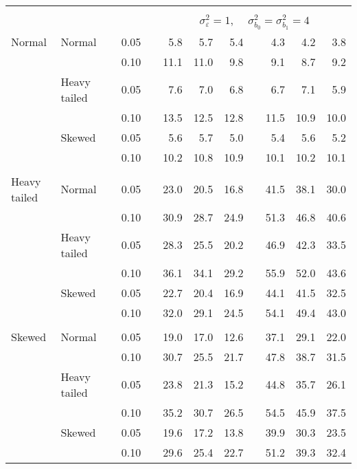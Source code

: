 \begin{table}[ht]
\begin{scriptsize}
\begin{center}
\begin{tabular}{ll p{.1cm} c p{.1cm} rrr p{.1cm} rrr}
&&&&&&&&&&&\\
& && && \multicolumn{7}{c}{$\sigma_{\varepsilon}^2 = 1$, \ \ $\sigma_{b_0}^2 = \sigma_{b_1}^2 = 4$} \\ \cline{6-12}
\rowcolor{gray!20}Normal       & Normal       && 0.05 &&   5.8 & 5.7 & 5.4 &   & 4.3 & 4.2 & 3.8 \\ 
\rowcolor{gray!20}             &              && 0.10 &&   11.1 & 11.0 & 9.8 &   & 9.1 & 8.7 & 9.2 \\ 
\rowcolor{gray!20}             & Heavy tailed && 0.05 &&   7.6 & 7.0 & 6.8 &   & 6.7 & 7.1 & 5.9 \\ 
\rowcolor{gray!20}             &              && 0.10 &&   13.5 & 12.5 & 12.8 &   & 11.5 & 10.9 & 10.0 \\ 
\rowcolor{gray!20}             & Skewed       && 0.05 &&   5.6 & 5.7 & 5.0 &   & 5.4 & 5.6 & 5.2 \\ 
\rowcolor{gray!20}             &              && 0.10 &&   10.2 & 10.8 & 10.9 &   & 10.1 & 10.2 & 10.1 \\ 
&&&&&&&&&&&\\
Heavy tailed & Normal       && 0.05 &&   23.0 & 20.5 & 16.8 &   & 41.5 & 38.1 & 30.0 \\ 
             &              && 0.10 &&   30.9 & 28.7 & 24.9 &   & 51.3 & 46.8 & 40.6 \\ 
             & Heavy tailed && 0.05 &&   28.3 & 25.5 & 20.2 &   & 46.9 & 42.3 & 33.5 \\ 
             &              && 0.10 &&   36.1 & 34.1 & 29.2 &   & 55.9 & 52.0 & 43.6 \\ 
             & Skewed       && 0.05 &&   22.7 & 20.4 & 16.9 &   & 44.1 & 41.5 & 32.5 \\ 
             &              && 0.10 &&   32.0 & 29.1 & 24.5 &   & 54.1 & 49.4 & 43.0 \\ 
&&&&&&&&&&&\\
Skewed       & Normal       && 0.05 &&   19.0 & 17.0 & 12.6 &   & 37.1 & 29.1 & 22.0 \\ 
             &              && 0.10 &&   30.7 & 25.5 & 21.7 &   & 47.8 & 38.7 & 31.5 \\ 
             & Heavy tailed && 0.05 &&   23.8 & 21.3 & 15.2 &   & 44.8 & 35.7 & 26.1 \\ 
             &              && 0.10 &&   35.2 & 30.7 & 26.5 &   & 54.5 & 45.9 & 37.5 \\ 
             & Skewed       && 0.05 &&   19.6 & 17.2 & 13.8 &   & 39.9 & 30.3 & 23.5 \\ 
             &              && 0.10 &&   29.6 & 25.4 & 22.7 &   & 51.2 & 39.3 & 32.4 \\ 

\hline
\end{tabular}
\end{center}
\end{scriptsize}
\end{table}

